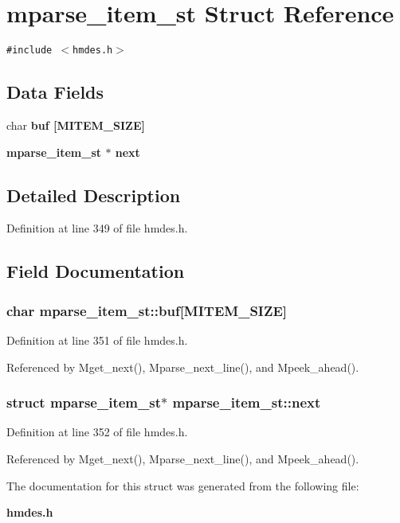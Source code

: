 \section{mparse\_\-item\_\-st Struct Reference}
\label{structmparse__item__st}
{\tt \#include $<$hmdes.h$>$}

\subsection*{Data Fields}
\begin{CompactItemize}
\item 
char \bf{buf} [MITEM\_\-SIZE]
\item 
\bf{mparse\_\-item\_\-st} $\ast$ \bf{next}
\end{CompactItemize}


\subsection{Detailed Description}




Definition at line 349 of file hmdes.h.

\subsection{Field Documentation}
\subsubsection{\setlength{\rightskip}{0pt plus 5cm}char \bf{mparse\_\-item\_\-st::buf}[MITEM\_\-SIZE]}\label{structmparse__item__st_a1c0c50833b59cce39c2993f70bbd4da}




Definition at line 351 of file hmdes.h.

Referenced by Mget\_\-next(), Mparse\_\-next\_\-line(), and Mpeek\_\-ahead().
\subsubsection{\setlength{\rightskip}{0pt plus 5cm}struct \bf{mparse\_\-item\_\-st}$\ast$ \bf{mparse\_\-item\_\-st::next}}\label{structmparse__item__st_fa0ef512228ae0a35b8b6cebfd0c7153}




Definition at line 352 of file hmdes.h.

Referenced by Mget\_\-next(), Mparse\_\-next\_\-line(), and Mpeek\_\-ahead().

The documentation for this struct was generated from the following file:\begin{CompactItemize}
\item 
\bf{hmdes.h}\end{CompactItemize}
